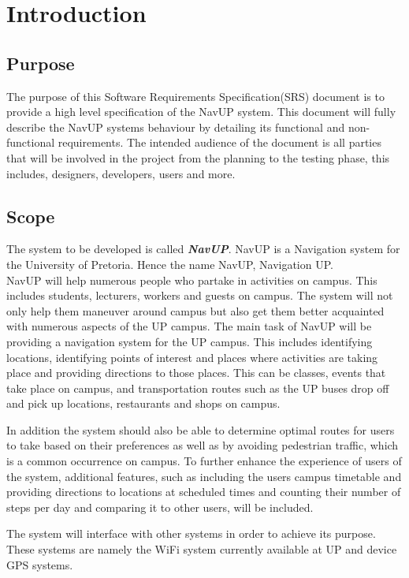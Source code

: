 \documentclass[a4paper,12pt]{article}
\begin{document}
\newpage
\tableofcontents
\newpage

\section{Introduction}
\subsection{Purpose}
The purpose of this Software Requirements Specification(SRS) document is to provide a high level specification of the NavUP system. This document will fully describe the NavUP systems behaviour by detailing its functional and non-functional requirements. The intended audience of the document is all parties that will be involved in the project from the planning to the testing phase, this includes, designers, developers, users and more.
\subsection{Scope}
The system to be developed is called \textit{\textbf{NavUP}}. NavUP is a Navigation system for the University of Pretoria. Hence the name NavUP, Navigation UP. \\

NavUP will help numerous people who partake in activities on campus. This includes students, lecturers, workers and guests on campus. The system will not only help them maneuver around campus but also get them better acquainted with numerous aspects of the UP campus. The main task of NavUP will be providing a navigation system for the UP campus. This includes identifying locations, identifying points of interest and places where activities are taking place and providing directions to those places. This can be classes, events that take place on campus, and transportation routes such as the UP buses drop off and pick up locations, restaurants and shops on campus.

In addition the system should also be able to determine optimal routes for users to take based on their preferences as well as by avoiding pedestrian traffic, which is a common occurrence on campus. To further enhance the experience of users of the system, additional features, such as including the users campus timetable and providing directions to locations at scheduled times and counting their number of steps per day and comparing it to other users, will be included. 

The system will interface with other systems in order to achieve its purpose. These systems are namely the WiFi system currently available at UP and device GPS systems.
\end{document}
